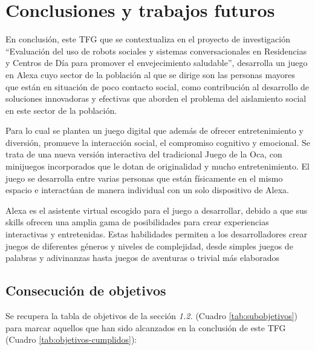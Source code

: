 \section{Conclusiones y trabajos futuros}

En conclusión, este TFG que se contextualiza en el proyecto de investigación \enquote{Evaluación del uso de robots sociales y sistemas conversacionales en Residencias y Centros de Día para promover el envejecimiento saludable}, desarrolla un juego en Alexa cuyo sector de la población al que se dirige son las personas mayores que están en situación de poco contacto social, como contribución al desarrollo de soluciones innovadoras y efectivas que aborden el problema del aislamiento social en este sector de la población.

Para lo cual se plantea un juego digital que además de ofrecer entretenimiento y diversión, promueve la interacción social, el compromiso cognitivo y emocional. Se trata de una nueva versión interactiva del tradicional Juego de la Oca, con minijuegos incorporados que le dotan de originalidad y mucho entretenimiento. El juego se desarrolla entre varias personas que están físicamente en el mismo espacio e interactúan de manera individual con un solo dispositivo de Alexa.

Alexa es el asistente virtual escogido para el juego a desarrollar, debido a que sus skills ofrecen una amplia gama de posibilidades para crear experiencias interactivas y entretenidas. Estas habilidades permiten a los desarrolladores crear juegos de diferentes géneros y niveles de complejidad, desde simples juegos de palabras y adivinanzas hasta juegos de aventuras o trivial más elaborados

\subsection{Consecución de objetivos}

Se recupera la tabla de objetivos de la sección \textit{1.2.} (Cuadro \ref{tab:subobjetivos}) para marcar aquellos que han sido alcanzados en la conclusión de este TFG (Cuadro \ref{tab:objetivos-cumplidos}):


